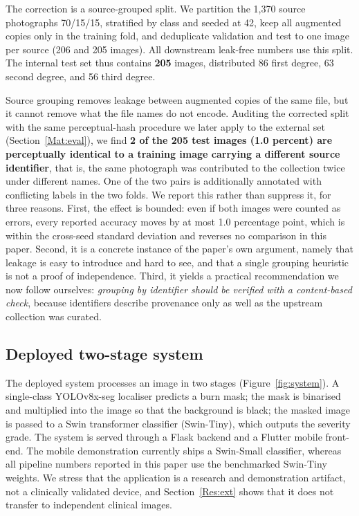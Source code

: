 \documentclass{elektr}
\begin{document}
The correction is a source-grouped split. We partition the 1{,}370 source photographs 70/15/15, stratified by class and seeded at 42, keep all augmented copies only in the training fold, and deduplicate validation and test to one image per source (206 and 205 images). All downstream leak-free numbers use this split. The internal test set thus contains \textbf{205} images, distributed 86 first degree, 63 second degree, and 56 third degree.

Source grouping removes leakage between augmented copies of the same file, but it cannot remove what the file names do not encode. Auditing the corrected split with the same perceptual-hash procedure we later apply to the external set (Section~\ref{Mat:eval}), we find \textbf{2 of the 205 test images (1.0 percent) are perceptually identical to a training image carrying a different source identifier}, that is, the same photograph was contributed to the collection twice under different names. One of the two pairs is additionally annotated with conflicting labels in the two folds. We report this rather than suppress it, for three reasons. First, the effect is bounded: even if both images were counted as errors, every reported accuracy moves by at most 1.0 percentage point, which is within the cross-seed standard deviation and reverses no comparison in this paper. Second, it is a concrete instance of the paper's own argument, namely that leakage is easy to introduce and hard to see, and that a single grouping heuristic is not a proof of independence. Third, it yields a practical recommendation we now follow ourselves: \emph{grouping by identifier should be verified with a content-based check}, because identifiers describe provenance only as well as the upstream collection was curated.

\subsection{Deployed two-stage system}
\label{Mat:system}
The deployed system processes an image in two stages (Figure~\ref{fig:system}). A single-class YOLOv8x-seg localiser predicts a burn mask; the mask is binarised and multiplied into the image so that the background is black; the masked image is passed to a Swin transformer classifier (Swin-Tiny), which outputs the severity grade. The system is served through a Flask backend and a Flutter mobile front-end. The mobile demonstration currently ships a Swin-Small classifier, whereas all pipeline numbers reported in this paper use the benchmarked Swin-Tiny weights. We stress that the application is a research and demonstration artifact, not a clinically validated device, and Section~\ref{Res:ext} shows that it does not transfer to independent clinical images.
\end{document}
